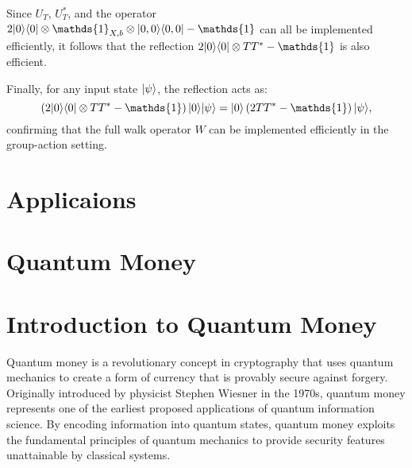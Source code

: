 \documentclass[11pt]{article}
\theoremstyle{definition}
\begin{document}
Since \( U_T \), \( U_T^* \), and the operator \( 2\ket{0}\bra{0} \otimes \mathds{1}_{X,b} \otimes \ket{0,0}\bra{0,0} - \mathds{1} \) can all be implemented efficiently, it follows that the reflection \( 2\ket{0}\bra{0} \otimes TT^* - \mathds{1} \) is also efficient.

Finally, for any input state \( \lvert\psi\rangle \), the reflection acts as:
\[
\left(2\ket{0}\bra{0} \otimes TT^* - \mathds{1} \right) \ket{0} \ket{\psi} = \ket{0} \left(2TT^* - \mathds{1} \right) \ket{\psi},
\]
confirming that the full walk operator \( W \) can be implemented efficiently in the group-action setting.










\section{Applicaions}
\section{Quantum Money}
\section*{Introduction to Quantum Money}
Quantum money is a revolutionary concept in cryptography that uses quantum mechanics to create a form of currency that is provably secure against forgery. Originally introduced by physicist Stephen Wiesner in the 1970s, quantum money represents one of the earliest proposed applications of quantum information science. By encoding information into quantum states, quantum money exploits the fundamental principles of quantum mechanics to provide security features unattainable by classical systems.


\end{document}
